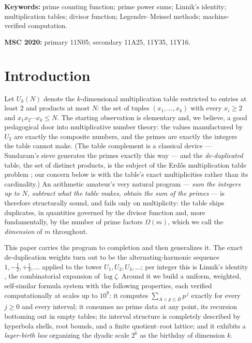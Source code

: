 \documentclass[11pt]{article}
\theoremstyle{remark}
\begin{document}
\medskip
\noindent\textbf{Keywords:} prime counting function; prime power sums; Linnik's identity;
multiplication tables; divisor function; Legendre--Meissel methods; machine-verified computation.

\smallskip
\noindent\textbf{MSC 2020:} primary 11N05; secondary 11A25, 11Y35, 11Y16.

\section{Introduction}

Let $U_k(N)$ denote the $k$-dimensional multiplication table restricted to entries at least $2$ and
products at most $N$: the set of tuples $(x_1, \dots, x_k)$ with every $x_i \ge 2$ and
$x_1 x_2 \cdots x_k \le N$. The starting observation is elementary and, we believe, a good pedagogical
door into multiplicative number theory: the values manufactured by $U_2$ are exactly the composite
numbers, and the primes are exactly the integers the table cannot make. (The table complement is a
classical device --- Sundaram's sieve \cite{Sundaram} generates the primes exactly this way --- and the
\emph{de-duplicated} table, the set of distinct products, is the subject of the Erd\H{o}s
multiplication table problem \cite{ErdosMT,Ford}; our concern below is with the table's exact
multiplicities rather than its cardinality.) An arithmetic amateur's very
natural program --- \emph{sum the integers up to $N$, subtract what the table makes, obtain the sum of
the primes} --- is therefore structurally sound, and fails only on multiplicity: the table ships
duplicates, in quantities governed by the divisor function and, more fundamentally, by the number of
prime factors $\Omega(m)$, which we call the \emph{dimension} of $m$ throughout.

This paper carries the program to completion and then generalizes it. The exact de-duplication weights
turn out to be the alternating-harmonic sequence $1, -\tfrac12, +\tfrac13, \dots$ applied to the tower
$U_1, U_2, U_3, \dots$; per integer this is Linnik's identity \cite{Linnik,FI}, the combinatorial
expansion of $\log \zeta$. Around it we build a uniform, weighted, self-similar formula system with the
following properties, each verified computationally at scales up to $10^9$: it computes
$\sum_{A < p \le B} p^{\,j}$ exactly for every $j \ge 0$ and every interval; it consumes no prime data at
any point, its recursion bottoming out in empty tables; its interval structure is completely described
by hyperbola shells, root bounds, and a finite quotient--root lattice; and it exhibits a
\emph{layer-birth law} organizing the dyadic scale $2^k$ as the birthday of dimension $k$.
\end{document}
